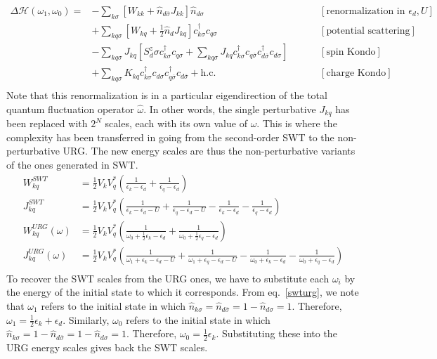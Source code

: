 \begin{equation}\begin{aligned}
	\Delta \mathcal{H}(\omega_1,\omega_0) =& - \sum_{k\sigma}\left[W_{kk} + \hat n_{d\overline\sigma}J_{kk}\right]\hat n_{d\sigma} &&&& \left[\text{renormalization in \(\epsilon_d, U\)}\right]\\
					       &+ \sum_{kq\sigma}\left[W_{kq} + \frac{1}{2} \hat n_d J_{kq}\right]c^\dagger_{k\sigma}c_{q\sigma} &&&& \left[\text{potential scattering}\right]\\
					       &- \sum_{kq\sigma}J_{kq}\left[S_d^z \sigma c^\dagger_{k\sigma}c_{q\sigma} + \sum_{kq\sigma}J_{kq} c^\dagger_{k\sigma}c_{q\overline\sigma}c^\dagger_{d\overline\sigma}c_{d\sigma}\right]  &&&& \left[\text{spin Kondo}\right]\\
					       &+ \sum_{kq\sigma}K_{kq}c^\dagger_{k\sigma}c_{d\sigma} c^\dagger_{q\overline\sigma}c_{d\overline\sigma} + \text{h.c.} &&&& \left[\text{charge Kondo}\right]\\
\end{aligned}\end{equation}
Note that this renormalization is in a particular eigendirection of the total quantum fluctuation operator \(\hat \omega\). In other words, the single perturbative \(J_{kq}\) has been replaced with \(2^N\) scales, each with its own value of \(\omega\). This is where the complexity has been transferred in going from the second-order SWT to the non-perturbative URG. The new energy scales are thus the non-perturbative variants of the ones generated in SWT.
\begin{equation}\begin{aligned}
	W^{SWT}_{kq} &= \frac{1}{2} V_k V_q^*\left(\frac{1}{\epsilon_k - \epsilon_d} + \frac{1}{\epsilon_q - \epsilon_d}\right)\\
	J^{SWT}_{kq} &= \frac{1}{2} V_k V_q^*\left(\frac{1}{\epsilon_k - \epsilon_d - U} + \frac{1}{\epsilon_q - \epsilon_d - U} - \frac{1}{\epsilon_k - \epsilon_d} - \frac{1}{\epsilon_q - \epsilon_d}\right)\\
	W^{URG}_{kq}(\omega) &= \frac{1}{2} V_k V_q^*\left(\frac{1}{\omega_0 + \frac{1}{2} \epsilon_k - \epsilon_d} + \frac{1}{\omega_0 + \frac{1}{2} \epsilon_q - \epsilon_d}\right)\\
	J^{URG}_{kq}(\omega) &= \frac{1}{2} V_k V_q^*\left(\frac{1}{\omega_1 + \epsilon_k - \epsilon_d - U} + \frac{1}{\omega_1 +\epsilon_q - \epsilon_d - U} - \frac{1}{\omega_0 +\epsilon_k - \epsilon_d} - \frac{1}{\omega_0 +\epsilon_q - \epsilon_d}\right)\\
\end{aligned}\end{equation}
To recover the SWT scales from the URG ones, we have to substitute each \(\omega_i\) by the energy of the initial state to which it corresponds. From eq.~\ref{swturg}, we note that \(\omega_1\) refers to the initial state in which \(\hat n_{k\sigma}=\hat n_{d\overline\sigma} = 1 - \hat n_{d\sigma} = 1\). Therefore, \(\omega_1 = \frac{1}{2}\epsilon_k + \epsilon_d\). Similarly, \(\omega_0\) refers to the initial state in which \(\hat n_{k\sigma}=1 - \hat n_{d\overline\sigma} = 1 - \hat n_{d\sigma} = 1\). Therefore, \(\omega_0 = \frac{1}{2}\epsilon_k\). Substituting these into the URG energy scales gives back the SWT scales.
